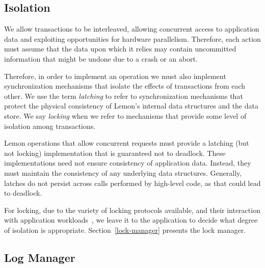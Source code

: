 \documentclass[10pt,letterpaper,twocolumn,english]{article}
\newcommand{\yad}{Lemon\xspace}
\begin{document}
\subsection{Isolation}
\label{Isolation}

We allow transactions to be interleaved, allowing concurrent access to
application data and exploiting opportunities for hardware
parallelism.  Therefore, each action must assume that the
data upon which it relies may contain uncommitted
information that might be undone due to a crash or an abort.


Therefore, in order to implement an operation we must also implement
synchronization mechanisms that isolate the effects of transactions
from each other.  We use the term {\em latching} to refer to
synchronization mechanisms that protect the physical consistency of
\yad's internal data structures and the data store.  We say {\em
locking} when we refer to mechanisms that provide some level of
isolation among transactions.  

\yad operations that allow concurrent requests must provide a latching
(but not locking) implementation that is guaranteed not to deadlock.
These implementations need not ensure consistency of application data.
Instead, they must maintain the consistency of any underlying data
structures.  Generally, latches do not persist across calls performed
by high-level code, as that could lead to deadlock.

For locking, due to the variety of locking protocols available, and
their interaction with application
workloads~\cite{multipleGenericLocking}, we leave it to the
application to decide what degree of isolation is
appropriate. Section~\ref{lock-manager} presents the lock manager.




\subsection{Log Manager}
\label{log-manager}
\end{document}
